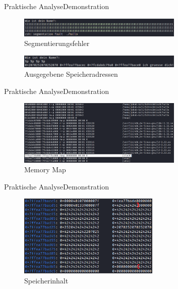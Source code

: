 \begin{frame}{Praktische Analyse}{Demonstration}
    \begin{figure}[h]
        \centering
        \includegraphics[width=0.7\textwidth,height=0.75\textheight,keepaspectratio]{images/segfault.png}
        \caption{Segmentierungsfehler}
    \end{figure}
    \begin{figure}[h]
        \centering
        \includegraphics[width=0.7\textwidth,height=0.75\textheight,keepaspectratio]{images/adressen.png}
        \caption{Ausgegebene Speicheradressen}
    \end{figure}
\end{frame}

\begin{frame}{Praktische Analyse}{Demonstration}
    \begin{figure}[h]
        \centering
        \includegraphics[width=0.7\textwidth,height=0.75\textheight,keepaspectratio]{images/map.png}
        \caption{Memory Map}
    \end{figure}
\end{frame}

\begin{frame}{Praktische Analyse}{Demonstration}
    \begin{figure}[h]
        \centering
        \includegraphics[width=0.6\textwidth,height=0.75\textheight,keepaspectratio]{images/buffer.png}
        \caption{Speicherinhalt}
    \end{figure}
\end{frame}

